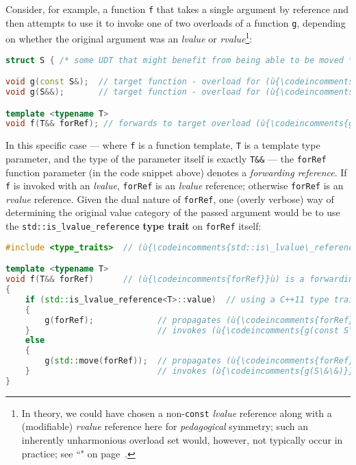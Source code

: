 Consider, for example, a function \texttt{f} that takes a single
argument by reference and then attempts to use it to invoke one of two
overloads of a function \texttt{g}, depending on whether the original
argument was an \emph{lvalue} or \emph{rvalue}{\cprotect\footnote{In
theory, we could have chosen a non-\texttt{const} \emph{lvalue}
reference along with a (modifiable) \emph{rvalue} reference here for
\emph{pedagogical} symmetry; such an inherently unharmonious overload
set would, however, not typically occur in practice; see ``" on page~\pageref{Rvalue-References}.}}:

\begin{lstlisting}[language=C++]
struct S { /* some UDT that might benefit from being able to be moved */ };

void g(const S&);  // target function - overload for (ù{\codeincomments{const}}ù) (ù{\codeincomments{int}}ù) lvalues
void g(S&&);       // target function - overload for (ù{\codeincomments{int}}ù) rvalues only

template <typename T>
void f(T&& forRef); // forwards to target overload (ù{\codeincomments{g}}ù) based on value category
\end{lstlisting}
    
\noindent In this specific case --- where \texttt{f} is a function template,
\texttt{T} is a template type parameter, and the type of the parameter
itself is exactly \texttt{T\&\&} --- the \texttt{forRef} function
parameter (in the code snippet above) denotes a \emph{forwarding reference}. If \texttt{f}\label{f-invoked-example}
is invoked with an \emph{lvalue}, \texttt{forRef} is an \emph{lvalue}
reference; otherwise \texttt{forRef} is an \emph{rvalue} reference.
Given the dual nature of \texttt{forRef}, one (overly verbose) way of
determining the original value category of the passed argument would be
to use the \texttt{std::is\_lvalue\_reference} \textbf{type trait} on
\texttt{forRef} itself:

\begin{lstlisting}[language=C++]
#include <type_traits>  // (ù{\codeincomments{std::is\_lvalue\_reference}}ù)

template <typename T>
void f(T&& forRef)      // (ù{\codeincomments{forRef}}ù) is a forwarding reference.
{
    if (std::is_lvalue_reference<T>::value)  // using a C++11 type trait
    {
        g(forRef);             // propagates (ù{\codeincomments{forRef}}ù) as an *lvalue*
    }                          // invokes (ù{\codeincomments{g(const S\&)}}ù)
    else
    {
        g(std::move(forRef));  // propagates (ù{\codeincomments{forRef}}ù) as an *rvalue*
    }                          // invokes (ù{\codeincomments{g(S\&\&)}}ù)
}
\end{lstlisting}
    
